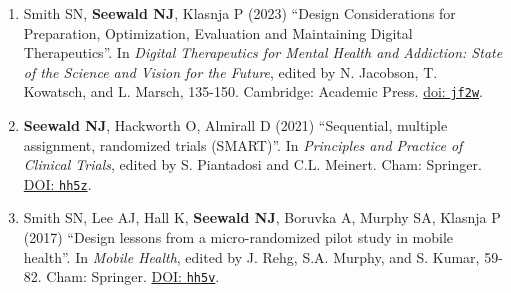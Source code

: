 \documentclass[letterpaper,11pt]{article} %
\begin{document}
		\begin{enumerate}			
			\item Smith SN, \textbf{Seewald NJ}, Klasnja P (2023) ``Design Considerations for Preparation, Optimization, Evaluation and Maintaining Digital Therapeutics''. In \textit{Digital Therapeutics for Mental Health and Addiction: State of the Science and Vision for the Future}, edited by N. Jacobson, T. Kowatsch, and L. Marsch, 135-150. Cambridge: Academic Press. \href{https://doi.org/jf2w}{doi: \texttt{jf2w}}.
			
			\item \textbf{Seewald NJ}, Hackworth O, Almirall D (2021) ``Sequential, multiple assignment, randomized trials (SMART)''. In \textit{Principles and Practice of Clinical Trials}, edited by S. Piantadosi and C.L. Meinert. Cham: Springer. \href{https://doi.org/hh5z}{DOI: \texttt{hh5z}}.
			
			\item  Smith SN, Lee AJ, Hall K, \textbf{Seewald NJ}, Boruvka A, Murphy SA, Klasnja P (2017) ``Design lessons from a micro-randomized pilot study in mobile health''. In \textit{Mobile Health}, edited by J. Rehg, S.A. Murphy, and S. Kumar, 59-82. Cham: Springer. \href{https://doi.org/hh5v}{DOI: \texttt{hh5v}}.
		\end{enumerate}
		
\end{document}
